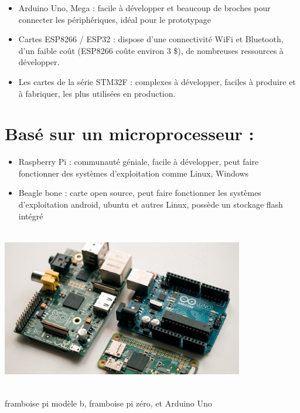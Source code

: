\documentclass[12pt]{report}
\begin{document}
\begin{itemize}
      \item
            Arduino Uno, Mega : facile à développer et beaucoup de broches pour
            connecter les périphériques, idéal pour le prototypage
      \item
            Cartes ESP8266 / ESP32 : dispose d'une connectivité WiFi et Bluetooth,
            d'un faible coût (ESP8266 coûte environ 3 \$), de nombreuses
            ressources à développer.
      \item
            Les cartes de la série STM32F : complexes à développer, faciles à
            produire et à fabriquer, les plus utilisées en production.
\end{itemize}

\hypertarget{basuxe9-sur-un-microprocesseur}{%
      \section{\texorpdfstring{Basé sur un microprocesseur :
        }{Basé sur un microprocesseur : }}\label{basuxe9-sur-un-microprocesseur}}

\begin{itemize}
      \item
            Raspberry Pi : communauté géniale, facile à développer, peut faire
            fonctionner des systèmes d'exploitation comme Linux, Windows
      \item
            Beagle bone : carte open source, peut faire fonctionner les systèmes d'exploitation android, ubuntu et autres
            Linux, possède un stockage flash intégré
\end{itemize}

\includegraphics[width=4.16667in,height=2.77778in]{figs/hardware_devices.jpg}

framboise pi modèle b, framboise pi zéro, et Arduino Uno
\end{document}

